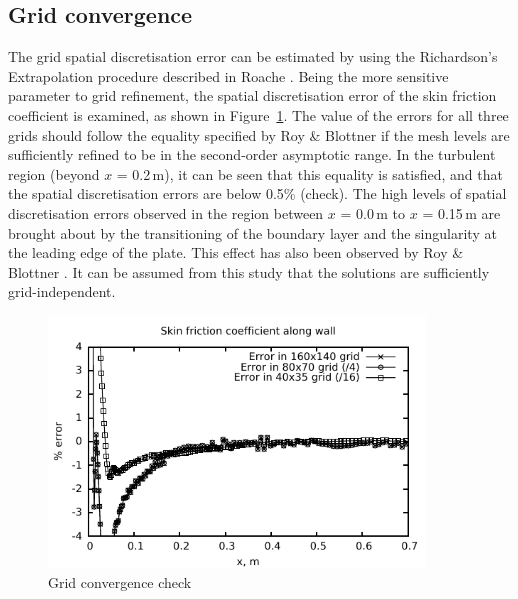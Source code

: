 \subsection{Grid convergence}
%
The grid spatial discretisation error can be estimated by using the
Richardson's Extrapolation procedure described in Roache \cite{Roache1998}. Being
the more sensitive parameter to grid refinement, the spatial discretisation
error of the skin friction coefficient is examined, as shown in
Figure~\ref{spatial-discretisation-error}. The value of the errors for all
three grids should follow the equality specified by Roy \& Blottner \cite{Roy2003} if
the mesh levels are sufficiently refined to be in the second-order asymptotic
range. In the turbulent region (beyond $x$ = 0.2\,m), it can be seen that this equality
is satisfied, and that the spatial discretisation errors are below 0.5\% (check).
The high levels of spatial discretisation errors observed in the region between
$x$ = 0.0\,m to $x$ = 0.15\,m are brought about by the transitioning of the boundary layer
and the singularity at the leading edge of the plate. This effect has also been
observed by Roy \& Blottner \cite{Roy2003}. It can be assumed from this study that the solutions
are sufficiently grid-independent.
\begin{figure}[h]
 \begin{center} \vspace{1cm}
  \includegraphics[width=10cm]{./chap2-flat-plate/figs/coles-x05-cf-error.pdf}
 \end{center}
 \caption{Grid convergence check}
 \label{spatial-discretisation-error}
\end{figure}
